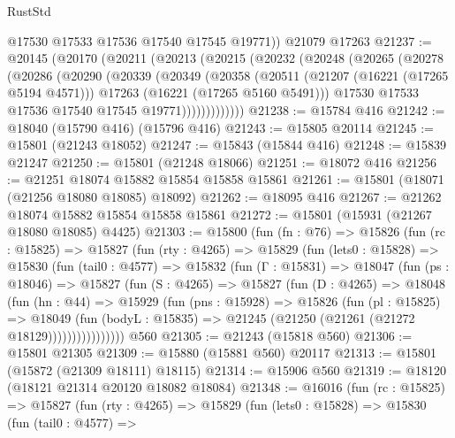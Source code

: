\begin{lexlean}{RustStd}
\begin{coremodule}
        @17530
        @17533
        @17536
        @17540
        @17545
        @19771))
    @21079
    @17263
@21237 := @20145
    (@20170
      (@20211
        (@20213
          (@20215
            (@20232
              (@20248
                (@20265
                  (@20278
                    (@20286
                      (@20290
                        (@20339
                          (@20349
                            (@20358
                              (@20511
                                (@21207 (@16221 (@17265 @5194 @4571)))
                                @17263
                                (@16221 (@17265 @5160 @5491)))
                              @17530
                              @17533
                              @17536
                              @17540
                              @17545
                              @19771)))))))))))))
@21238 := @15784 @416
@21242 := @18040 (@15790 @416) (@15796 @416)
@21243 := @15805 @20114
@21245 := @15801 (@21243 @18052)
@21247 := @15843 (@15844 @416)
@21248 := @15839 @21247
@21250 := @15801 (@21248 @18066)
@21251 := @18072 @416
@21256 := @21251 @18074 @15882 @15854 @15858 @15861
@21261 := @15801 (@18071 (@21256 @18080 @18085) @18092)
@21262 := @18095 @416
@21267 := @21262 @18074 @15882 @15854 @15858 @15861
@21272 := @15801 (@15931 (@21267 @18080 @18085) @4425)
@21303 := @15800
    (fun (fn : @76) =>
    @15826
      (fun (rc : @15825) =>
      @15827
        (fun (rty : @4265) =>
        @15829
          (fun (lets0 : @15828) =>
          @15830
            (fun (tail0 : @4577) =>
            @15832
              (fun (Γ : @15831) =>
              @18047
                (fun (ps : @18046) =>
                @15827
                  (fun (S : @4265) =>
                  @15827
                    (fun (D : @4265) =>
                    @18048
                      (fun (hn : @44) =>
                      @15929
                        (fun (pns : @15928) =>
                        @15826
                          (fun (pl : @15825) =>
                          @18049
                            (fun (bodyL : @15835) =>
                            @21245 (@21250 (@21261 (@21272 @18129))))))))))))))))
    @560
@21305 := @21243 (@15818 @560)
@21306 := @15801 @21305
@21309 := @15880 (@15881 @560) @20117
@21313 := @15801 (@15872 (@21309 @18111) @18115)
@21314 := @15906 @560
@21319 := @18120 (@18121 @21314 @20120 @18082 @18084)
@21348 := @16016
    (fun (rc : @15825) =>
    @15827
      (fun (rty : @4265) =>
      @15829
        (fun (lets0 : @15828) =>
        @15830
          (fun (tail0 : @4577) =>

\end{coremodule}
\end{lexlean}
